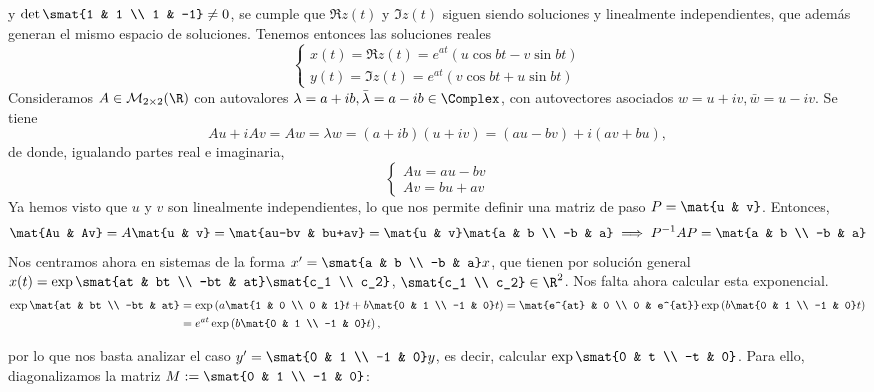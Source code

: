 \documentclass[../ecuaciones_diferenciales.tex]{subfiles}
\begin{document}
y \(\det\smat{1 & 1 \\ 1 & -1} \neq 0\), se cumple que \(\Re z(t)\) y
\(\Im z(t)\) siguen siendo soluciones y linealmente independientes, que además
generan el mismo espacio de soluciones. Tenemos entonces las soluciones reales
\[
	\begin{cases}
		x(t) = \Re z(t) = e^{at}(u\cos bt - v\sin bt) \\
		y(t) = \Im z(t) = e^{at}(v\cos bt + u\sin bt)
	\end{cases}
\]
Consideramos \(A \in \mathcal{M}_{2 \times 2}(\R)\) con autovalores
\(\lambda = a+ib, \bar{\lambda} = a-ib \in \Complex\), con autovectores
asociados \(w = u+iv, \bar{w} = u-iv\). Se tiene
\[Au + iAv = Aw = \lambda w = (a+ib)(u+iv) = (au-bv) + i(av+bu),\]
de donde, igualando partes real e imaginaria,
\[
	\begin{cases}
		Au = au-bv \\
		Av = bu+av
	\end{cases}
\]
Ya hemos visto que \(u\) y \(v\) son linealmente independientes, lo que nos
permite definir una matriz de paso \(P = \mat{u & v}\). Entonces,
\[\mat{Au & Av} = A \mat{u & v} = \mat{au-bv & bu+av} = \mat{u & v} \mat{a & b
		\\ -b & a} \implies P^{-1}AP = \mat{a & b \\ -b & a}\]
Nos centramos ahora en sistemas de la forma \(x' = \smat{a & b \\ -b & a}x\),
que tienen por solución general \(x(t) = \exp \smat{at & bt \\ -bt & at}
\smat{c_1 \\ c_2}\), \(\smat{c_1 \\ c_2} \in \R^2\). Nos falta ahora calcular
esta exponencial.
\begin{align*}
	\exp\mat{at & bt                            \\ -bt & at} &= \exp\left(a\mat{1 & 0 \\ 0 & 1}t + b\mat{0 & 1 \\
	-1          & 0}t\right) = \mat{e^{at}  & 0 \\ 0 & e^{at}} \exp\left(b\mat{0 & 1
	\\ -1 & 0}t\right) \\
	            & = e^{at}\exp\left(b\mat{0 & 1 \\ -1 & 0}t\right),
\end{align*}

por lo que nos basta analizar el caso \(y' = \smat{0 & 1 \\ -1 & 0}y\), es
decir, calcular \(\exp \smat{0 & t \\ -t & 0}\). Para ello, diagonalizamos la
matriz \(M := \smat{0 & 1 \\ -1 & 0}\):
\end{document}
